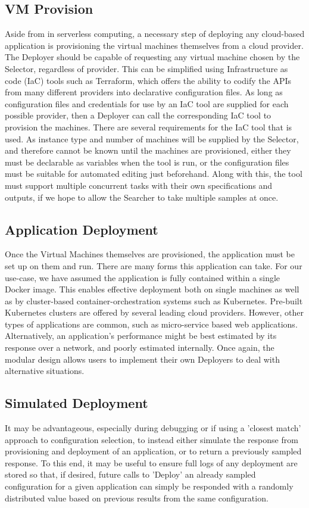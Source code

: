 \documentclass{report}
\begin{document}
\subsection{VM Provision}
Aside from in serverless computing, a necessary step of deploying any cloud-based application is provisioning the virtual machines themselves from a cloud provider. The Deployer should be capable of requesting any virtual machine chosen by the Selector, regardless of provider. This can be simplified using Infrastructure as code (IaC) tools such as Terraform, which offers the ability to codify the APIs from many different providers into declarative configuration files. As long as configuration files and credentials for use by an IaC tool are supplied for each possible provider, then a Deployer can call the corresponding IaC tool to provision the machines. 
There are several requirements for the IaC tool that is used. As instance type and number of machines will be supplied by the Selector, and therefore cannot be known until the machines are provisioned, either they must be declarable as variables when the tool is run, or the configuration files must be suitable for automated editing just beforehand. Along with this, the tool must support multiple concurrent tasks with their own specifications and outputs, if we hope to allow the Searcher to take multiple samples at once.

\subsection{Application Deployment}
Once the Virtual Machines themselves are provisioned, the application must be set up on them and run. There are many forms this application can take. For our use-case, we have assumed the application is fully contained within a single Docker image. This enables effective deployment both on single machines as well as by cluster-based container-orchestration systems such as Kubernetes. Pre-built Kubernetes clusters are offered by several leading cloud providers. However, other types of applications are common, such as micro-service based web applications. Alternatively, an application's performance might be best estimated by its response over a network, and poorly estimated internally. Once again, the modular design allows users to implement their own Deployers to deal with alternative situations. 

\subsection{Simulated Deployment}
It may be advantageous, especially during debugging or if using a 'closest match' approach to configuration selection, to instead either simulate the response from provisioning and deployment of an application, or to return a previously sampled response. To this end, it may be useful to ensure full logs of any deployment are stored so that, if desired, future calls to 'Deploy' an already sampled configuration for a given application can simply be responded with a randomly distributed value based on previous results from the same configuration.
\end{document}

